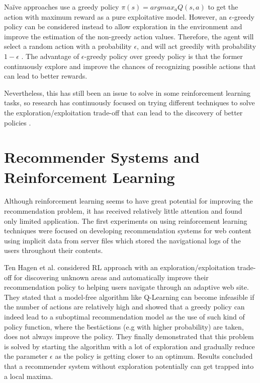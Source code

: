 Na\"{i}ve approaches use a greedy policy $\pi(s) = argmax_aQ(s, a)$ to get the action with maximum reward as a pure exploitative model. However, an $\epsilon$-greedy policy can be considered instead to allow exploration in the environment and improve the estimation of the non-greedy action values. Therefore, the agent will select a random action with a probability $\epsilon$, and will act greedily with probability $1 - \epsilon$ . The advantage of $\epsilon$-greedy policy over greedy policy is that the former continuously explore and improve the chances of recognizing possible actions that can lead to better rewards. 

Nevertheless, this has still been an issue to solve in some reinforcement learning tasks, so research has continuously focused on trying different techniques to solve the exploration/exploitation trade-off that can lead to the discovery of better policies \cite{kaelbling1996reinforcement}.

\section{Recommender Systems and Reinforcement Learning}

Although reinforcement learning seems to have great potential for improving the recommendation problem, it has received relatively little attention and found only limited application. The first experiments on using reinforcement learning techniques were focused on developing recommendation systems for web content using implicit data from server files which stored the navigational logs of the users throughout their contents. 

Ten Hagen et al. \cite{ten2003exploration} considered RL approach with an exploration/exploitation trade-off for discovering unknown areas and automatically improve their recommendation policy to helping users navigate through an adaptive web site. They stated that a model-free algorithm like Q-Learning can become infeasible if the number of actions are relatively high and showed that a greedy policy can indeed lead to a suboptimal recommendation model as the use of such kind of policy function, where the \"best\" actions (e.g with higher probability) are taken, does not always improve the policy. They finally demonstrated that this problem is solved by starting the algorithm with a lot of exploration and gradually reduce the parameter $\epsilon$ as the policy is getting closer to an optimum. Results concluded that a recommender system without exploration potentially can get trapped into a local maxima.

